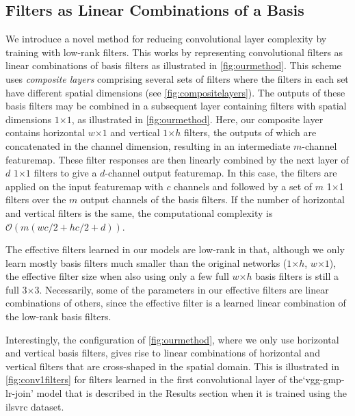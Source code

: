 \documentclass[thesis]{subfiles}
\begin{document}
    \subsection{Filters as Linear Combinations of a Basis}
    We introduce a novel method for reducing convolutional layer complexity by training with low-rank filters. This works by representing convolutional filters as linear combinations of basis filters as illustrated in \cref{fig:ourmethod}. This scheme uses \emph{composite layers} comprising several sets of filters where the filters in each set have different spatial dimensions (see \cref{fig:compositelayers}). The outputs of these basis filters may be combined in a subsequent layer containing filters with spatial dimensions $1$$\times$$1$, as illustrated in \cref{fig:ourmethod}. Here, our composite layer contains horizontal $w$$\times$$1$ and vertical $1$$\times$$h$ filters, the outputs of which are concatenated in the channel dimension, resulting in an intermediate $m$-channel \gls{featuremap}. These filter responses are then linearly combined by the next layer of $d$ $1$$\times$$1$ filters to give a $d$-channel output \gls{featuremap}. In this case, the filters are applied on the input \gls{featuremap} with $c$ channels and followed by a set of $m$ 1$\times$1 filters over the $m$ output channels of the basis filters. If the number of horizontal and vertical filters is the same, the computational complexity is $\mathcal{O}( m(wc/2 +hc/2 + d))$.
    
    The effective filters learned in our models are low-rank in that, although we only learn mostly basis filters much smaller than the original networks (\eg $1$$\times$$h$, $w$$\times$$1$), the effective filter size when also using only a few full $w$$\times$$h$ basis filters is still a full 3$\times$3. Necessarily, some of the parameters in our effective filters are linear combinations of others, since the effective filter is a learned linear combination of the low-rank basis filters.
    
    Interestingly, the configuration of \cref{fig:ourmethod}, where we only use horizontal and vertical basis filters, gives rise to linear combinations of horizontal and vertical filters that are cross-shaped in the spatial domain. This is illustrated in \cref{fig:conv1filters} for filters learned in the first convolutional layer of the`vgg-gmp-lr-join' model that is described in the Results section when it is trained using the \gls{ilsvrc} dataset.
    
\end{document}
